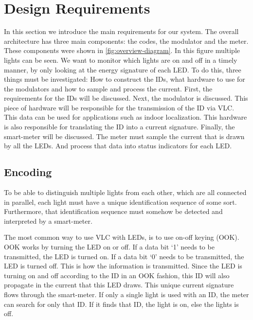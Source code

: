 
\chapter{Design Requirements}
\label{chp:design-requirements}


In this section we introduce the main requirements for our system. The overall architecture has three main components: the codes, the modulator and the meter. 
These components were shown in \autoref{fig:overview-diagram}.
In this figure multiple lights can be seen.
We want to monitor which lights are on and off in a timely manner, by only looking at the energy signature of each LED.
To do this, three things must be investigated: How to construct the IDs, what hardware to use for the modulators and how to sample and process the current.
First, the requirements for the IDs will be discussed.
Next, the modulator is discussed. 
This piece of hardware will be responsible for the transmission of the ID via VLC.
This data can be used for applications such as indoor localization.
This hardware is also responsible for translating the ID into a current signature.
Finally, the smart-meter will be discussed.
The meter must sample the current that is drawn by all the LEDs.
And process that data into status indicators for each LED.








	\section{Encoding}

	To be able to distinguish multiple lights from each other, which are all connected in parallel, each light must have a unique identification sequence of some sort.
	Furthermore, that identification sequence must somehow be detected and interpreted by a smart-meter.


	The most common way to use VLC with LEDs, is to use on-off keying (OOK).
	OOK works by turning the LED on or off.
	If a data bit `1' needs to be transmitted, the LED is turned on.
	If a data bit `0' needs to be transmitted, the LED is turned off.
	This is how the information is transmitted.
	Since the LED is turning on and off according to the ID in an OOK fashion, this ID will also propagate in the current that this LED draws.
	This unique current signature flows through the smart-meter.
	If only a single light is used with an ID, the meter can search for only that ID.
	If it finds that ID, the light is on, else the lights is off.


